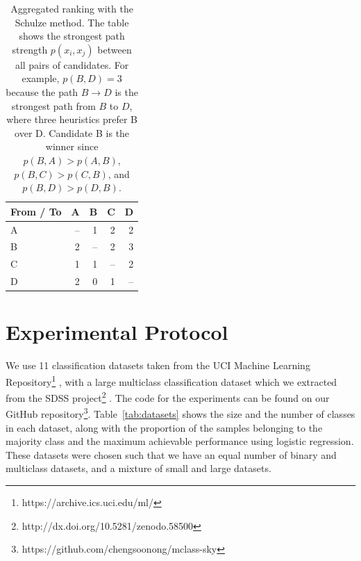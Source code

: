 \documentclass[fleqn,10pt,lineno]{wlpeerj} %
\begin{document}
\begin{table}[htbp]
	\begin{subtable}{\linewidth}
		\centering
		\begin{tabular}{lrrrr}
			\toprule
			{From / To}  & A & B & C & D \\
			\midrule
				A & -- & 1 & 2 & 2 \\
				B & 2 & -- & 2 & 3 \\
				C & 1 & 1 & -- & 2 \\
				D & 2 & 0 & 1 & -- \\
			\bottomrule
		\end{tabular}
		\caption{Aggregated ranking with the Schulze method. The table shows
		the strongest path strength $p(x_i, x_j)$ between all pairs of
		candidates. For example, $p(B, D) = 3$ because the path $B \rightarrow
		D$ is the strongest path from $B$ to $D$, where three heuristics prefer
		B over D. Candidate B is the winner since $p(B, A) > p(A, B)$, $p(B, C)
		> p(C, B)$, and $p(B, D) > p(D, B)$.}
	\end{subtable}
\end{table}


\section{Experimental Protocol}\label{sec:expt}

We use 11 classification datasets taken from the UCI Machine Learning
Repository\footnote{https://archive.ics.uci.edu/ml/} \citep{lichman13},
with a large multiclass classification dataset which we extracted from the SDSS
project\footnote{http://dx.doi.org/10.5281/zenodo.58500} \citep{alam15}. The
code for the experiments can be found on our GitHub
repository\footnote{https://github.com/chengsoonong/mclass-sky}.
Table~\ref{tab:datasets} shows the size and the number of classes in each
dataset, along with the proportion of the samples belonging to the majority
class and the maximum achievable performance using logistic regression. These
datasets were chosen such that we have an equal number of binary and multiclass
datasets, and a mixture of small and large datasets.
\end{document}
